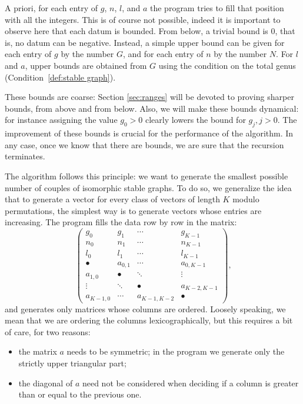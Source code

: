 \documentclass{amsart}
\theoremstyle{plain}
\theoremstyle{definition}
\begin{document}


A priori, for each entry of $g$, $n$, $l$, and $a$ the program tries
to fill that position with all the integers. This is of course not
possible, indeed it is important to observe here that each datum is
bounded. From below, a trivial bound is $0$, that is, no datum can be
negative. Instead, a simple upper bound can be given for each entry of
$g$ by the number $G$, and for each entry of $n$ by the number
$N$. For $l$ and $a$, upper bounds are obtained from $G$ using the
condition on the total genus (Condition~\ref{def:stable graph}).

These bounds are coarse: Section \ref{sec:ranges} will be devoted to
proving sharper bounds, from above and from below. Also, we will make
these bounds dynamical: for instance assigning the value $g_0 > 0$
clearly lowers the bound for $g_j, j > 0$. The improvement of these
bounds is crucial for the performance of the algorithm. In any case,
once we know that there are bounds, we are sure that the recursion
terminates.

The algorithm follows this principle: we want to generate the smallest
possible number of couples of isomorphic stable graphs. To do so, we
generalize the idea that to generate a vector for every class of
vectors of length $K$ modulo permutations, the simplest way is to
generate vectors whose entries are increasing. The program fills the
data row by row in the matrix:
\begin{equation}\label{eq:big matrix}
  \begin{pmatrix}
    g_0 & g_1 & \cdots & g_{K-1}\\
    n_0 & n_1 & \cdots & n_{K-1}\\
    l_0 & l_1 & \cdots & l_{K-1}\\
    \hline
    \bullet & a_{0,1} & \cdots & a_{0,K-1}\\
    a_{1,0} & \bullet & \ddots & \vdots\\
    \vdots & \ddots & \bullet & a_{K-2,K-1}\\
    a_{K-1,0} & \cdots & a_{K-1,K-2} & \bullet
  \end{pmatrix}\text{,}
\end{equation}
and generates only matrices whose columns are ordered. Loosely
speaking, we mean that we are ordering the columns lexicographically,
but this requires a bit of care, for two reasons:
\begin{itemize}
\item the matrix $a$ needs to be symmetric; in the program we generate
  only the strictly upper triangular part;
\item the diagonal of $a$ need not be considered when deciding if a
  column is greater than or equal to the previous one.
\end{itemize}
\end{document}
